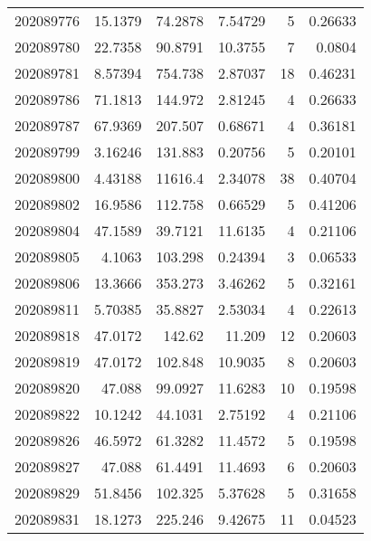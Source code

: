 \begin{tabular}{rrrrrr}
 202089776 &         15.1379  &       74.2878 &            7.54729 &           5 & 0.26633 \\
 202089780 &         22.7358  &       90.8791 &           10.3755  &           7 & 0.0804  \\
 202089781 &          8.57394 &      754.738  &            2.87037 &          18 & 0.46231 \\
 202089786 &         71.1813  &      144.972  &            2.81245 &           4 & 0.26633 \\
 202089787 &         67.9369  &      207.507  &            0.68671 &           4 & 0.36181 \\
 202089799 &          3.16246 &      131.883  &            0.20756 &           5 & 0.20101 \\
 202089800 &          4.43188 &    11616.4    &            2.34078 &          38 & 0.40704 \\
 202089802 &         16.9586  &      112.758  &            0.66529 &           5 & 0.41206 \\
 202089804 &         47.1589  &       39.7121 &           11.6135  &           4 & 0.21106 \\
 202089805 &          4.1063  &      103.298  &            0.24394 &           3 & 0.06533 \\
 202089806 &         13.3666  &      353.273  &            3.46262 &           5 & 0.32161 \\
 202089811 &          5.70385 &       35.8827 &            2.53034 &           4 & 0.22613 \\
 202089818 &         47.0172  &      142.62   &           11.209   &          12 & 0.20603 \\
 202089819 &         47.0172  &      102.848  &           10.9035  &           8 & 0.20603 \\
 202089820 &         47.088   &       99.0927 &           11.6283  &          10 & 0.19598 \\
 202089822 &         10.1242  &       44.1031 &            2.75192 &           4 & 0.21106 \\
 202089826 &         46.5972  &       61.3282 &           11.4572  &           5 & 0.19598 \\
 202089827 &         47.088   &       61.4491 &           11.4693  &           6 & 0.20603 \\
 202089829 &         51.8456  &      102.325  &            5.37628 &           5 & 0.31658 \\
 202089831 &         18.1273  &      225.246  &            9.42675 &          11 & 0.04523 \\

\end{tabular}
